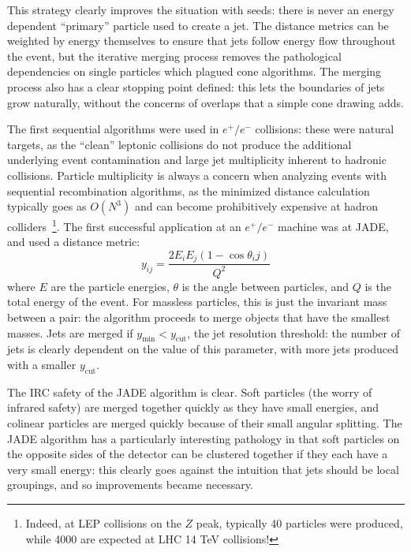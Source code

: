 This strategy clearly improves the situation with seeds: there is never an energy dependent ``primary'' particle used to create a jet. The distance metrics can be weighted by energy themselves to ensure that jets follow energy flow throughout the event, but the iterative merging process removes the pathological dependencies on single particles which plagued cone algorithms. The merging process also has a clear stopping point defined: this lets the boundaries of jets grow naturally, without the concerns of overlaps that a simple cone drawing adds.


The first sequential algorithms were used in $e^+/e^-$ collisions: these were natural targets, as the ``clean'' leptonic collisions do not produce the additional underlying event contamination and large jet multiplicity inherent to hadronic collisions. Particle multiplicity is always a concern when analyzing events with sequential recombination algorithms, as the minimized distance calculation typically goes as $O(N^3)$ and can become prohibitively expensive at hadron colliders~\cite{Jetography}\footnote{Indeed, at LEP collisions on the $Z$ peak, typically 40 particles were produced, while 4000 are expected at LHC 14 TeV collisions!}. The first successful application at an $e^+/e^-$ machine was at JADE, and used a distance metric:
%
\begin{equation}
y_{ij} = \frac{2 E_i E_j (1 - \cos \theta_ij)}{Q^2}
\end{equation}
%
where $E$ are the particle energies, $\theta$ is the angle between particles, and $Q$ is the total energy of the event\cite{Jetography}. For massless particles, this is just the invariant mass between a pair: the algorithm proceeds to merge objects that have the smallest masses. Jets are merged if $y_\mathrm{min} < y_\mathrm{cut}$, the jet resolution threshold: the number of jets is clearly dependent on the value of this parameter, with more jets produced with a smaller $y_\mathrm{cut}$.

The IRC safety of the JADE algorithm is clear. Soft particles (the worry of infrared safety) are merged together quickly as they have small energies, and colinear particles are merged quickly because of their small angular splitting. The JADE algorithm has a particularly interesting pathology in that soft particles on the opposite sides of the detector can be clustered together if they each have a very small energy: this clearly goes against the intuition that jets should be local groupings, and so improvements became necessary.

